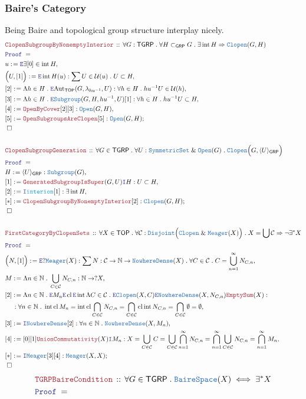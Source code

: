 \documentclass[12pt]{scrartcl}
\newcommand{\TYPE}[1]{\textcolor{NavyBlue}{\mathtt{#1}}}
\newcommand{\FUNC}[1]{\textcolor{Cerulean}{\mathtt{#1}}}
\newcommand{\LOGIC}[1]{\textcolor{Blue}{\mathtt{#1}}}
\newcommand{\THM}[1]{\textcolor{Maroon}{\mathtt{#1}}}
\renewcommand{\.}{\; . \;}
\newcommand{\de}{: \kern 0.1pc =}
\newcommand{\Theorem}[2]{& \THM{#1} \, :: \, #2 \\ & \Proof = \\ }
\newcommand{\NewLine}{\\ & \kern 1pc}
\newcommand{\Page}[1]{ \begin{align*} #1 \end{align*}   }
\renewcommand{\And}{\; \& \;}
\newcommand{\Imply}{\Rightarrow}
\newcommand{\Nat}{\mathbb{N} }
\newcommand{\Aut}{\mathrm{Aut}}
\newcommand{\Say}[3]{& #1 \de #2 : #3, \\}
\newcommand{\SayIn}[3]{& #1 \de #2 \in #3, \\}
\newcommand{\Conclude}[3]{& #1 \de #2 : #3; \\}
\newcommand{\Intro}{\LOGIC{I}}
\newcommand{\Elim}{\LOGIC{E}}
\newcommand{\QED}{\; \square}
\newcommand{\EndProof}{& \QED \\}
\newcommand{\Proof}{\LOGIC{Proof} \; }
\renewcommand{\C}{\mathcal{C}}
\newcommand{\ND}{\TYPE{NowhereDense}}
\newcommand{\Open}{\TYPE{Open}}
\newcommand{\Clopen}{\TYPE{Clopen}}
\newcommand{\Bair}{\TYPE{BaireSpace}}
\newcommand{\Meager}{\TYPE{Meager}}
\DeclareMathOperator*{\intx}{int}
\DeclareMathOperator*{\cl}{cl}
\newcommand{\TOP}{\mathsf{TOP}}
\renewcommand{\U}{\mathcal{U}}
\newcommand{\Sgrp}{\subset_{\mathsf{GRP}}}
\newcommand{\GRP}{\mathsf{GRP}}
\renewcommand{\SS}{\TYPE{SymmetricSet}}
\newcommand{\TGRP}{\mathsf{TGRP}}
\begin{document}
\subsubsection{Baire's Category}
Being Baire and topological group structure interplay nicely. 
\Page{
	\Theorem{ClopenSubgroupByNonemptyInterior}
	{
		\forall G : \TGRP \.
		\forall H \Sgrp G \.
		\exists \intx H  
		\Imply
		\Clopen(G,H)
	}
	\SayIn{u}{\Elim \exists [0]}{\intx H}
	\Say{\Big( U, [1]\Big)}{\Elim \intx H(u)}
	{
		\sum U \in \U(u) \. U \subset H
	}
	\Say{[2]}{\Lambda h \in H \. \Elim \Aut_{\TOP}(G,\lambda_{hu^{-1}},U)}
	{
		\forall h \in H \.   hu^{-1}U \in \U(h)
	}
	\Say{[3]}{\Lambda h \in H \. \Elim \TYPE{Subgroup}(G, H,hu^{-1},U)[1]}
	{
		\forall h \in H \.   hu^{-1}U \subset H
	}
	\Say{[4]}{\THM{OpenByCover}[2][3]}{\Open(G,H)}
	\Conclude{[5]}{\THM{OpenSubgroupsAreClopen}[5]}{\Open(G,H)}
	\EndProof
	\\
	\Theorem{ClopenSubgroupGeneration}
	{
		\forall G \in \TGRP \.
		\forall U : \SS \And \Open(G) \.
		\Clopen\Big( G, \langle U \rangle_\GRP \Big) 
	}
	\Say{H}{\langle U \rangle_\GRP}{\TYPE{Subgroup}(G)}
	\Say{[1]}{\THM{GeneratedSubgroupIsSuper}(G,U)\Intro H}
	{
		U \subset H
	}
	\Say{[2]}{\Intro \FUNC{interion} [1]}{\exists \intx H}
	\Conclude{[*]}{\THM{ClopenSubgroupByNonemptyInterior}[2]}
	{
		\Clopen(G,H)
	}
	\EndProof
	\\
	\Theorem{FirstCategoryByClopenSets}
	{
		\forall X \in \TOP \. 
		\forall \C : \TYPE{Disjoint}\Big(\Clopen \And \Meager(X)\Big) \.
		X = \bigcup \C
		\Imply
		\neg \exists^* X
	}
	\Say{\Big(N,[1]\Big)}{\Elim ?\Meager(X)}
	{
		\sum N : \C \to \Nat \to \ND(X) \.
		\forall C \in \C \. C = \bigcup^\infty_{n=1} N_{C,n}
	}
	\Say{M}{\Lambda n \in \Nat \. \bigcup_{C \in \C} N_{C,n}}
	{
		\Nat \to ?X
	}
	\Say{[2]}{
		\Lambda n \in \Nat \.
		\Elim M_n 
		\Elim \cl  \Elim\intx
		\Lambda C \in \C \. \Elim \Clopen(X,C)
		\Elim \ND(X,N_{C,n})  
		\THM{EmptySum}(X)
	}
	{
		\NewLine :		
		\forall n \in \Nat \. 
		\intx \cl  M_n = 
		\intx \cl \bigcap_{C \in \C} N_{C,n}  =
		\bigcap_{C \in \C}  \cl \intx  N_{C,n} =
		\bigcap_{C \in \C} \emptyset =
		\emptyset
	}
	\Say{[3]}{\Intro \ND[2]}
	{
		\forall n \in \Nat \. \ND(X,M_n)
	}
	\Say{[4]}{[0][1]\THM{UnionCommutativity}(X)\Intro M_n}
	{
		X = \bigcup_{C \in \C} C = 
		\bigcup_{C \in \C} \bigcap^\infty_{n=1} N_{C,n} = 
		\bigcap^\infty_{n=1} \bigcup_{C \in \C}  N_{C,n} =
		\bigcap^\infty_{n=1} M_n
	}
	\Conclude{[*]}{\Intro \Meager [3][4]}{\Meager(X,X)}
	\EndProof
}\Page{
	\Theorem{TGRPBaireCondition}
	{
		\forall G \in \TGRP \. \Bair(X) \iff \exists^* X
}}
\end{document}
